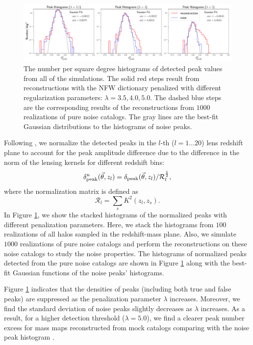 \begin{figure}
 \centering
 \includegraphics[width=1.0\textwidth]{peak_histograms_NFW.pdf}
 \caption{The number per square degree histograms of detected peak values from
     all of the simulations.  The solid red steps result from reconstructions
     with the NFW dictionary penalized with different regularization
     parameters: $\lambda=3.5,4.0,5.0$. The dashed blue steps are the
     corresponding results of the reconstructions from $1000$ realizations of
     pure noise catalogs. The gray lines are the best-fit Gaussian distributions
     to the histograms of noise peaks.
    }\label{fig_peakHist}
\end{figure}

Following \citet{WL-massMap-Glimpse2D-Lanusse2016}, we normalize the detected
peaks in the $l$-th ($l=1...20$) lens redshift plane to account for the peak
amplitude difference due to the difference in the norm of the lensing kernels
for different redshift bins:
\begin{equation}
\delta^{\rm{n}}_{\rm{peak}}(\vec{\theta},z_l)=\delta_{\rm{peak}}(\vec{\theta},z_l)/\mathcal{R}_{l}^{\frac{1}{2}},
\end{equation}
where the normalization matrix is defined as
\begin{equation}
\mathcal{R}_{l}=\sum_s K^2(z_l,z_s).
\end{equation}
In Figure \ref{fig_peakHist}, we show the stacked histograms of the
normalized peaks with different penalization parameters. Here, we stack the
histograms from $100$ realizations of all halos sampled in the redshift-mass
plane.
Also, we simulate $1000$ realizations of pure noise catalogs and perform the
reconstructions on these noise catalogs to study the noise properties.  The
histograms of normalized peaks detected from the pure noise catalogs are shown
in Figure \ref{fig_peakHist} along with the best-fit Gaussian functions of the
noise peaks' histograms.

Figure \ref{fig_peakHist} indicates that the densities of peaks (including both
true and false peaks) are suppressed as the penalization parameter $\lambda$
increases. Moreover, we find the standard deviation of noise peaks slightly
decreases as $\lambda$ increases. As a result, for a higher detection threshold
($\lambda=5.0$), we find a clearer peak number excess for mass maps
reconstructed from mock catalogs comparing with the noise peak histogram .

